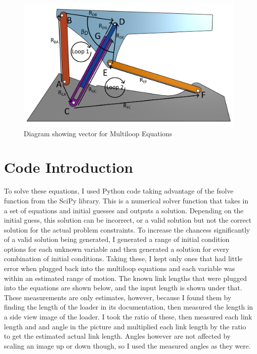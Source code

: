 \documentclass[hidelinks]{article}
\begin{document}
    \begin{figure}[ht]
        \centering
        \includegraphics[width=1\linewidth]{MultiLoopClosureAnnotated.png}
        \caption{Diagram showing vector for Multiloop Equations}\label{fig:multiloop}
    \end{figure}
    \FloatBarrier\section*{Code Introduction}
    To solve these equations, I used Python code taking advantage of the fsolve function from the SciPy library. This is a numerical solver function that takes in a set of equations and initial guesses and outputs a solution. Depending on the initial guess, this solution can be incorrect, or a valid solution but not the correct solution for the actual problem constraints. To increase the chancess significantly of a valid solution being generated, I generated a range of initial condition options for each unknown variable and then generated a solution for every combination of initial conditions. Taking these, I kept only ones that had little error when plugged back into the multiloop equations and each variable was within an estimated range of motion. The known link lengths that were plugged into the equations are shown below, and the input length is shown under that. These measurements are only estimates, however, because I found them by finding the length of the loader in its documentation, then measured the length in a side view image of the loader. I took the ratio of these, then measured each link length and and angle in the picture and multiplied each link length by the ratio to get the estimated actual link length. Angles however are not affected by scaling an image up or down though, so I used the measured angles as they were.
\end{document}
